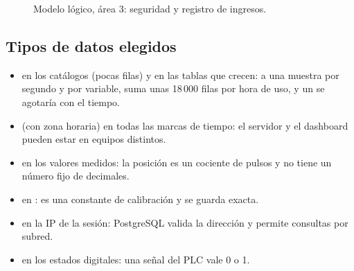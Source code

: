 \documentclass[a4paper,11pt]{article}
\newcommand{\pk}[1]{\underline{\textbf{#1}}}
\newcommand{\fk}[1]{\textit{#1}}
\begin{document}
\begin{figure}[H]
\centering
{}
\caption{Modelo lógico, área 3: seguridad y registro de ingresos.}\label{fig:log3}
\end{figure}

\subsection{Tipos de datos elegidos}
\begin{itemize}
\item {} en los catálogos (pocas filas) y  en las tablas que crecen: a una muestra por segundo y por variable,  suma unas 18\,000 filas por hora de uso, y un  se agotaría con el tiempo.
\item {} (con zona horaria) en todas las marcas de tiempo: el servidor y el dashboard pueden estar en equipos distintos.
\item {} en los valores medidos: la posición es un cociente de pulsos y no tiene un número fijo de decimales.
\item {} en : es una constante de calibración y se guarda exacta.
\item {} en la IP de la sesión: PostgreSQL valida la dirección y permite consultas por subred.
\item {} en los estados digitales: una señal del PLC vale 0 o 1.
\end{itemize}
\end{document}
